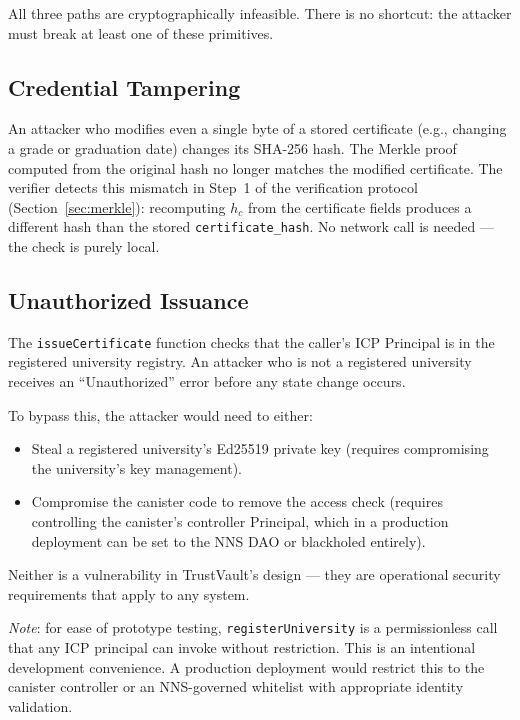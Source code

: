 \documentclass[journal]{IEEEtran}
\begin{document}
All three paths are cryptographically infeasible. There is no shortcut: the attacker must break at least one of these primitives.

\subsection{Credential Tampering}

An attacker who modifies even a single byte of a stored certificate (e.g., changing a grade or graduation date) changes its SHA-256 hash. The Merkle proof computed from the original hash no longer matches the modified certificate. The verifier detects this mismatch in Step~1 of the verification protocol (Section~\ref{sec:merkle}): recomputing $h_c$ from the certificate fields produces a different hash than the stored \texttt{certificate\_hash}. No network call is needed — the check is purely local.

\subsection{Unauthorized Issuance}

The \texttt{issueCertificate} function checks that the caller's ICP Principal is in the registered university registry. An attacker who is not a registered university receives an ``Unauthorized'' error before any state change occurs.

To bypass this, the attacker would need to either:
\begin{itemize}[leftmargin=*]
  \item Steal a registered university's Ed25519 private key (requires compromising the university's key management).
  \item Compromise the canister code to remove the access check (requires controlling the canister's controller Principal, which in a production deployment can be set to the NNS DAO or blackholed entirely).
\end{itemize}

Neither is a vulnerability in TrustVault's design — they are operational security requirements that apply to any system.

\textit{Note}: for ease of prototype testing, \texttt{registerUniversity} is a permissionless call that any ICP principal can invoke without restriction. This is an intentional development convenience. A production deployment would restrict this to the canister controller or an NNS-governed whitelist with appropriate identity validation.
\end{document}

